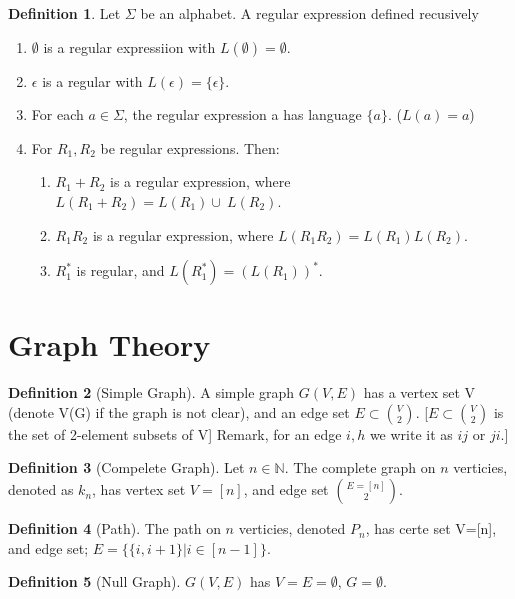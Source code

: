 \documentclass{article}
\theoremstyle{definition}
\newtheorem{define}{Definition}[section]
\begin{document}
\begin{define}
Let $\Sigma$ be an alphabet. A regular expression defined recusively 
	\begin{enumerate}
		\item $\emptyset$ is a regular expressiion with $L(\emptyset) = \emptyset$.
		\item $\epsilon$ is a regular with $L(\epsilon) = \{\epsilon\}$.
		\item For each $a\in \Sigma$, the regular expression a has language $\{a\}$. ($L(a) = {a}$)
		\item For $R_1, R_2$ be regular expressions. Then:
    			\begin{enumerate}
				\item $R_1+R_2$ is a regular expression, where $L(R_1+R_2)=L(R_1)\cup\ L(R_2)$. 
     				\item $R_1R_2$ is a regular expression, where $L(R_1R_2) = L(R_1)L(R_2)$.
      				\item $R_1^*$ is regular, and $L(R_1^*) = (L(R_1))^*$.
    			\end{enumerate}
	\end{enumerate}
\end{define}


\section{Graph Theory}

\begin{define}[Simple Graph]
A simple graph $G(V,E)$ has a vertex set V (denote  V(G) if the graph is not clear), and an edge set $E\subset {{V}\choose{2}}$. [$E\subset {{V}\choose{2}}$ is the set of 2-element subsets of V] Remark, for an edge ${i,h}$ we write it as $ij$ or $ji$.]
\end{define}

\begin{define}[Compelete Graph]
Let $n\in \mathbb{N}$. The complete graph on $n$ verticies, denoted as $k_n$, has vertex set $V=[n]$, and edge set $E={[n]}\choose{2}$.
\end{define}

\begin{define}[Path]
The path on $n$ verticies, denoted $P_n$, has certe set V=[n], and edge set; $E = \{\{i, i+1\}| i \in [n-1]\}$.
\end{define}

\begin{define}[Null Graph]
$G(V,E)$ has $V=E=\emptyset$, $G=\emptyset$.
\end{define}
\end{document}
